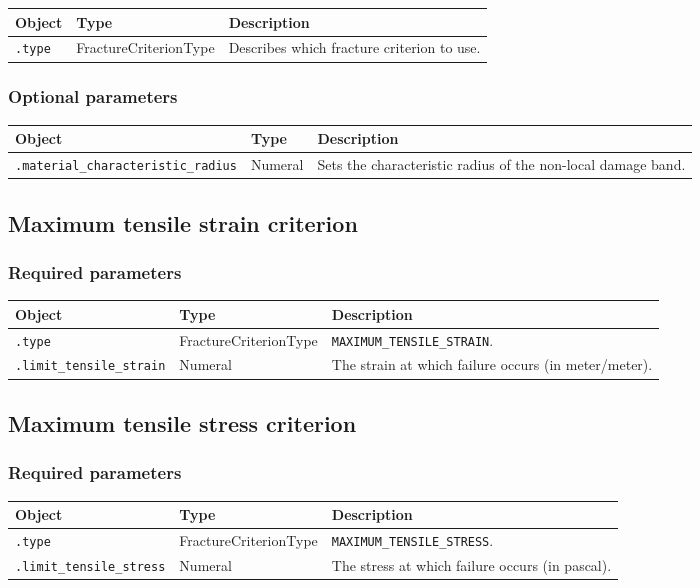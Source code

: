 \documentclass[10pt]{article}
\begin{document}
\begin{tabularx}{\textwidth}{llX}
\hline 
Object & Type & Description \\ 
\hline 
\verb+.type+ & FractureCriterionType & Describes which fracture criterion to use. \\ 
\hline 
\end{tabularx}

\subsubsection*{Optional parameters}

\begin{tabularx}{\textwidth}{llX}
\hline 
Object & Type & Description \\ 
\hline 
\verb+.material_characteristic_radius+ & Numeral & Sets the characteristic radius of the non-local damage band. \\ 
\hline 
\end{tabularx}

\subsection{Maximum tensile strain criterion}

\subsubsection*{Required parameters}

\begin{tabularx}{\textwidth}{llX}
\hline 
Object & Type & Description \\ 
\hline 
\verb+.type+ & FractureCriterionType & \verb+MAXIMUM_TENSILE_STRAIN+. \\ 
\verb+.limit_tensile_strain+ & Numeral & The strain at which failure occurs (in meter/meter).\\
\hline 
\end{tabularx}

\subsection{Maximum tensile stress criterion}

\subsubsection*{Required parameters}

\begin{tabularx}{\textwidth}{llX}
\hline 
Object & Type & Description \\ 
\hline 
\verb+.type+ & FractureCriterionType & \verb+MAXIMUM_TENSILE_STRESS+. \\ 
\verb+.limit_tensile_stress+ & Numeral & The stress at which failure occurs (in pascal).\\
\hline 
\end{tabularx}
\end{document}
